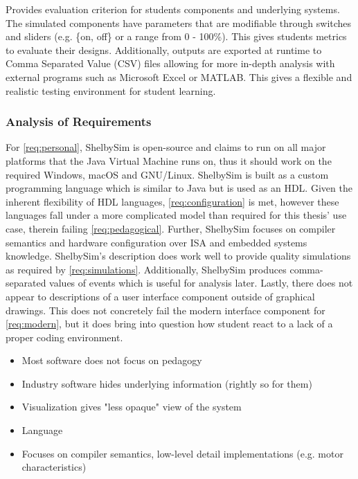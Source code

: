 Provides evaluation criterion for students components and underlying systems. The simulated components have parameters that are modifiable through switches and sliders (e.g. \{on, off\} or a range from 0 - 100\%). This gives students metrics to evaluate their designs. Additionally, outputs are exported at runtime to Comma Separated Value (CSV) files allowing for more in-depth analysis with external programs such as Microsoft Excel or MATLAB. This gives a flexible and realistic testing environment for student learning. 

\subsubsection{Analysis of Requirements}

For \cref{req:personal}, ShelbySim is open-source and claims to run on all major platforms that the Java Virtual Machine runs on, thus it should work on the required Windows, macOS and GNU/Linux\cite{Oracle2017}. ShelbySim is built as a custom programming language which is similar to Java but is used as an HDL. Given the inherent flexibility of HDL languages, \cref{req:configuration} is met, however these languages fall under a more complicated model than required for this thesis' use case, therein failing \cref{req:pedagogical}. Further, ShelbySim focuses on compiler semantics and hardware configuration over ISA and embedded systems knowledge.  ShelbySim's description does work well to provide quality simulations as required by \cref{req:simulations}. Additionally, ShelbySim produces comma-separated values of events which is useful for analysis later. Lastly, there does not appear to descriptions of a user interface component outside of graphical drawings. This does not concretely fail the modern interface component for \cref{req:modern}, but it does bring into question how student react to a lack of a proper coding environment.

\begin{itemize}
    \item Most software does not focus on pedagogy
    \item Industry software hides underlying information (rightly so for them)
    \item Visualization gives "less opaque" view of the system
    \item Language 
    \item Focuses on compiler semantics, low-level detail implementations (e.g. motor characteristics)
\end{itemize}

